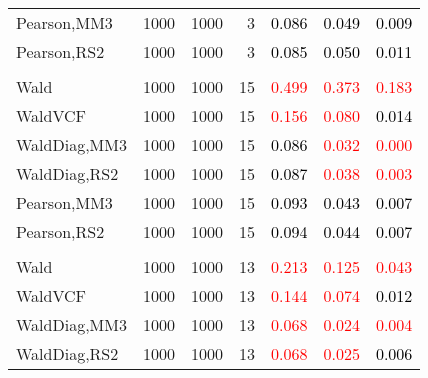 \documentclass[
]{article}
\begin{document}
\begin{table}[H]
{\begin{tabular}[t]{lrrrrrr}
\hspace{1em}Pearson,MM3 & 1000 & 1000 & 3 & \textcolor{black}{0.086} & \textcolor{black}{0.049} & \textcolor{black}{0.009}\\
\hspace{1em}Pearson,RS2 & 1000 & 1000 & 3 & \textcolor{black}{0.085} & \textcolor{black}{0.050} & \textcolor{black}{0.011}\\
\addlinespace[0.3em]
\multicolumn{7}{l}{\textbf{1F 15V}}\\
\hspace{1em}Wald & 1000 & 1000 & 15 & \textcolor{red}{0.499} & \textcolor{red}{0.373} & \textcolor{red}{0.183}\\
\hspace{1em}WaldVCF & 1000 & 1000 & 15 & \textcolor{red}{0.156} & \textcolor{red}{0.080} & \textcolor{black}{0.014}\\
\hspace{1em}WaldDiag,MM3 & 1000 & 1000 & 15 & \textcolor{black}{0.086} & \textcolor{red}{0.032} & \textcolor{red}{0.000}\\
\hspace{1em}WaldDiag,RS2 & 1000 & 1000 & 15 & \textcolor{black}{0.087} & \textcolor{red}{0.038} & \textcolor{red}{0.003}\\
\hspace{1em}Pearson,MM3 & 1000 & 1000 & 15 & \textcolor{black}{0.093} & \textcolor{black}{0.043} & \textcolor{black}{0.007}\\
\hspace{1em}Pearson,RS2 & 1000 & 1000 & 15 & \textcolor{black}{0.094} & \textcolor{black}{0.044} & \textcolor{black}{0.007}\\
\addlinespace[0.3em]
\multicolumn{7}{l}{\textbf{2F 10V}}\\
\hspace{1em}Wald & 1000 & 1000 & 13 & \textcolor{red}{0.213} & \textcolor{red}{0.125} & \textcolor{red}{0.043}\\
\hspace{1em}WaldVCF & 1000 & 1000 & 13 & \textcolor{red}{0.144} & \textcolor{red}{0.074} & \textcolor{black}{0.012}\\
\hspace{1em}WaldDiag,MM3 & 1000 & 1000 & 13 & \textcolor{red}{0.068} & \textcolor{red}{0.024} & \textcolor{red}{0.004}\\
\hspace{1em}WaldDiag,RS2 & 1000 & 1000 & 13 & \textcolor{red}{0.068} & \textcolor{red}{0.025} & \textcolor{black}{0.006}\\

\end{tabular}}
\end{table}
\end{document}
